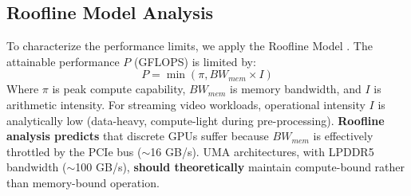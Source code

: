 \documentclass[conference]{IEEEtran}
\begin{document}
\subsection{Roofline Model Analysis}
To characterize the performance limits, we apply the Roofline Model \cite{b2}. The attainable performance $P$ (GFLOPS) is limited by:
\begin{equation}
P = \min(\pi, BW_{mem} \times I)
\end{equation}
Where $\pi$ is peak compute capability, $BW_{mem}$ is memory bandwidth, and $I$ is arithmetic intensity. 
For streaming video workloads, operational intensity $I$ is analytically low (data-heavy, compute-light during pre-processing). \textbf{Roofline analysis predicts} that discrete GPUs suffer because $BW_{mem}$ is effectively throttled by the PCIe bus ($\sim$16 GB/s). UMA architectures, with LPDDR5 bandwidth ($\sim$100 GB/s), \textbf{should theoretically} maintain compute-bound rather than memory-bound operation.
\end{document}
